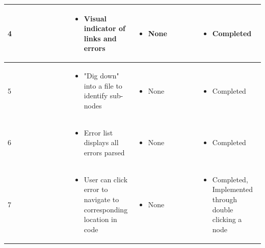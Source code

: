 \documentclass[letterpaper,10pt,titlepage,draftclsnofoot,onecolumn,onesided] {IEEEtran}
\begin{document}
{\begin{center}
\begin{singlespace}
\begin{tabular}{ |  p{0.25\linewidth}  |  p{0.25\linewidth}  | p{0.25\linewidth} | p{0.25\linewidth} |}
        \\ \hline

            4
		& 
			\begin{itemize}
				\item Visual indicator of links and errors
			\end{itemize}
		& 
			\begin{itemize}
				\item None
			\end{itemize}
		&
			\begin{itemize}
				\item Completed
			\end{itemize} 
		
        \\ \hline

        	5
		& 
			\begin{itemize}
				\item "Dig down" into a file to identify sub-nodes
			\end{itemize}
		& 
			\begin{itemize}
				\item None
			\end{itemize}
		&
			\begin{itemize}
				\item Completed
			\end{itemize} 
		
        \\ \hline

        	6
		& 
			\begin{itemize}
				\item Error list displays all errors parsed
			\end{itemize}
		& 
			\begin{itemize}
				\item None
			\end{itemize}
		&
			\begin{itemize}
				\item Completed
			\end{itemize} 
		
        \\ \hline

        	7
		& 
			\begin{itemize}
				\item User can click error to navigate to corresponding location in code
			\end{itemize}
		& 
			\begin{itemize}
				\item None
			\end{itemize}
		&
			\begin{itemize}
				\item Completed, Implemented through double clicking a node
			\end{itemize} 
		

\end{tabular}
\end{singlespace}
\end{center}}
\end{document}
